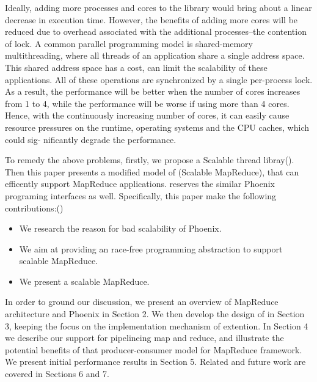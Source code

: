 Ideally, adding more processes and cores to the library
would bring about a linear decrease in execution time.
However, the benefits of adding more
cores will be reduced due to overhead associated with the
additional processes--the contention of lock.
A common parallel programming model is shared-memory multithreading, 
where all threads of an application share a single address space. 
This shared address space has a
cost, can limit the scalability of these applications. 
All of these operations are synchronized by a single per-process lock. 
As a result, the performance will be better 
when the number of cores increases from 1 to 4, 
while the performance will be worse if using more than 4 cores.  
Hence, with the continuously increasing
number of cores, it can easily cause resource pressures on the
runtime, operating systems and the CPU caches, which could sig-
nificantly degrade the performance. 



To remedy the above problems, 
firstly, we propose a Scalable thread libray(\myth).
Then this paper presents a modified model of \myds(Scalable MapReduce), 
that can efficently support MapReduce applications.
\myds reserves the similar Phoenix programing interfaces as well.
Specifically, this paper make the following contributions:()
\begin{itemize}
  \item We research the reason for bad scalability of Phoenix.
  \item We aim at providing an race-free programming abstraction to
support scalable MapReduce.
  \item We present a scalable MapReduce.
\end{itemize}

In order to ground our discussion, we present an overview
of MapReduce architecture and Phoenix in Section 2. 
We then develop the design of \myth in Section 3, 
keeping the focus on the implementation mechanism of extention. 
In Section 4 we describe our support for pipelineing map and reduce,
and illustrate the potential benefits of that producer-consumer model for MapReduce framework. 
We present initial performance results in Section 5. 
Related and future work are covered in Sections 6 and 7.



